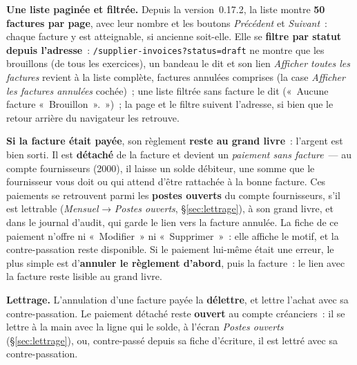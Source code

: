 \documentclass[a4paper,11pt,oneside]{article}
\begin{document}
\textbf{Une liste paginée et filtrée.} Depuis la version~0.17.2, la liste montre
\textbf{50 factures par page}, avec leur nombre et les boutons \emph{Précédent} et \emph{Suivant}~:
chaque facture y est atteignable, si ancienne soit-elle. Elle se \textbf{filtre par statut depuis
l'adresse}~: \texttt{/supplier-invoices?status=draft} ne montre que les brouillons (de tous les
exercices), un bandeau le dit et son lien \emph{Afficher toutes les factures} revient à la liste
complète, factures annulées comprises (la case \emph{Afficher les factures annulées} cochée)~;
une liste filtrée sans facture le dit («~Aucune facture «~Brouillon~».~»)~; la page et le filtre suivent l'adresse, si bien que le retour arrière du navigateur les
retrouve.

\textbf{Si la facture était payée}, son règlement \textbf{reste au grand livre}~: l'argent est
bien sorti. Il est \textbf{détaché} de la facture et devient un \emph{paiement sans facture}~---
au compte fournisseurs (2000), il laisse un solde débiteur, une somme que le fournisseur vous
doit ou qui attend d'être rattachée à la bonne facture. Ces paiements se retrouvent parmi les
\textbf{postes ouverts} du compte fournisseurs, s'il est lettrable (\emph{Mensuel} →
\emph{Postes ouverts}, \S\ref{sec:lettrage}), à son grand livre, et dans le journal d'audit, qui garde le lien vers
la facture annulée. La fiche de ce paiement n'offre ni «~Modifier~» ni «~Supprimer~»~: elle affiche le motif, et la contre-passation reste disponible. Si le paiement lui-même était une erreur, le plus simple est d'\textbf{annuler le
règlement d'abord}, puis la facture~: le lien avec la facture reste lisible au grand livre.

\textbf{Lettrage.} L'annulation d'une facture payée la \textbf{délettre}, et lettre l'achat avec
sa contre-passation. Le paiement détaché reste \textbf{ouvert} au compte créanciers~: il se
lettre à la main avec la ligne qui le solde, à l'écran \emph{Postes ouverts}
(\S\ref{sec:lettrage}), ou, contre-passé depuis sa fiche d'écriture, il est lettré
avec sa contre-passation.
\end{document}
